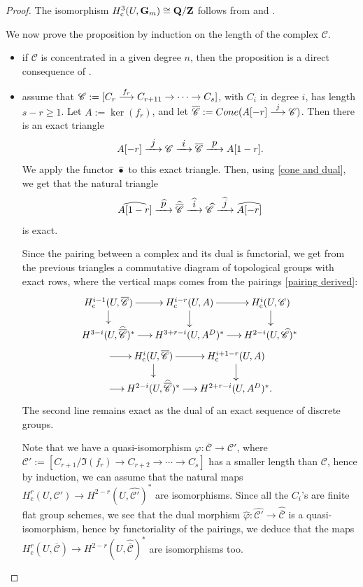\documentclass[11pt]{article}
\let\mathcal\mathscr
\newcommand\To[1]{\mathchoice{\xrightarrow{\textstyle\kern4pt#1\kern3pt}}{\stackrel{#1}{\longrightarrow}}{}{}}
\newcommand{\sbullet}{{\scriptscriptstyle\bullet}}
\newcommand{\rc}{\mathrm{c}}
\theoremstyle{plain}
\theoremstyle{definition}
\newcommand \ZZ {\mathbf{Z}}
\newcommand \QQ {\mathbf{Q}}
\newcommand \cC {\mathcal{C}}
\begin{document}
\begin{proof}
The isomorphism $H^3_\rc(U,\G) \cong \QQ/\ZZ$ follows from \cite[Prop.\,II.2.6]{MilADT} and \cite[Prop.\,2.1\,(4)]{DemH}.

We now prove the proposition by induction on the length of the complex $\cC$.
\begin{itemize}
\item if $\cC$ is concentrated in a given degree $n$, then the proposition is a direct consequence of \cite[Th.\,1.1]{DemH}.
\item assume that $\cC:= [C_r \To{f_r} C_{r+11} \to \cdots\to C_s]$, with $C_i$ in degree $i$, has length $s-r \geq 1$.
Let $A:= \ker(f_r)$, and let $\overline{\cC}:= \textup{Cone}(A[-r] \To{j} \cC)$. Then there is an exact triangle\vspace*{-3pt}
\[
A[-r] \To{j} \cC \To{i} \overline{\cC} \To{p} A[1-r].
\]
We apply the functor $\widehat{\sbullet}$ to this exact triangle. Then, using \eqref{cone and dual}, we get that the natural triangle\vspace*{-3pt}
\[
\widehat{A[1-r]} \To{\widehat{p}} \widehat{\overline{\cC}} \To{\widehat{i}} \widehat{\cC} \To{\widehat{j}} \widehat{A[-r]}
\]
is exact.

Since the pairing between a complex and its dual is functorial, we get from the previous triangles a commutative diagram of topological groups with exact rows, where the vertical maps comes from the pairings \eqref{pairing derived}:\vspace*{-3pt}
\begin{multline} \label{devissage AMM1}
\begin{array}{c}
\xymatrix@=5mm{
H^{i-1}_\rc(U, \overline{\cC}) \ar[r] \ar[d] & H^{i-r}_\rc(U, A) \ar[r] \ar[d] & H^i_\rc(U, \cC)\ar[d] \\
H^{3-i}(U, \widehat{\overline{\cC}})^* \ar[r] & H^{3+r-i}(U, A^D)^* \ar[r] & H^{2-i}(U, \widehat{\cC})^*
}
\end{array}\\
\xymatrix@=5mm{
\mbox{}\ar[r] & H^{i}_\rc(U, \overline{\cC}) \ar[r] \ar[d] & H^{i+1-r}_\rc(U, A) \ar[d] \\
\mbox{}\ar[r] & H^{2-i}(U, \widehat{\overline{\cC}})^* \ar[r] & H^{2+r-i}(U, A^D)^*.
}
\end{multline}
The second line remains exact as the dual of an exact sequence of discrete groups.

Note that we have a quasi-isomorphism $\varphi: \overline{\cC} \to \cC'$, where $\cC':= [C_{r+1}/\Im(f_r) \to C_{r+2} \to \cdots\to C_s]$ has a smaller length than $\cC$, hence by induction, we can assume that the natural maps $H^r_\rc(U, \cC') \to H^{2-r}(U, \widehat{\cC'})^*$ are isomorphisms. Since all the $C_i$'s are finite flat group schemes, we see that the dual morphism $\widehat{\varphi}: \widehat{\cC'} \to \widehat{\overline{\cC}}$ is a quasi-isomorphism, hence by functoriality of the pairings, we deduce that the maps $H^r_\rc(U, \overline{\cC}) \to H^{2-r}(U, \widehat{\overline{\cC}})^*$ are isomorphisms too.


\end{itemize}
\end{proof}
\end{document}
